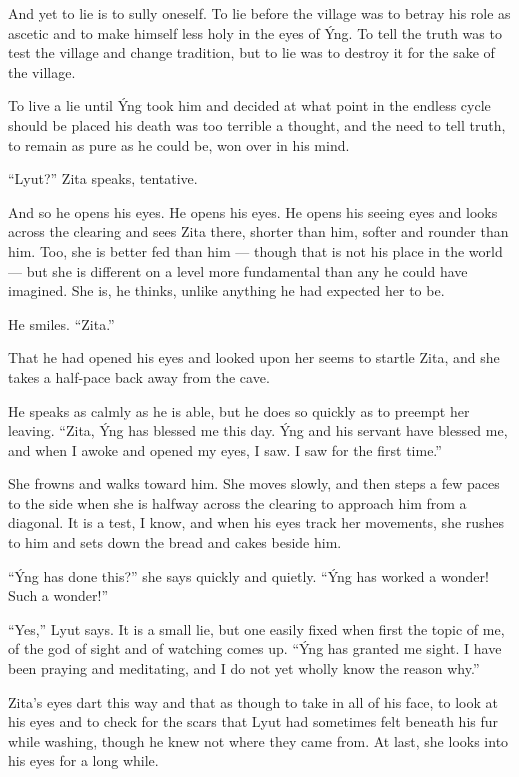 And yet to lie is to sully oneself. To lie before the village was to betray his role as ascetic and to make himself less holy in the eyes of Ýng. To tell the truth was to test the village and change tradition, but to lie was to destroy it for the sake of the village.

To live a lie until Ýng took him and decided at what point in the endless cycle should be placed his death was too terrible a thought, and the need to tell truth, to remain as pure as he could be, won over in his mind.

``Lyut?'' Zita speaks, tentative.

And so he opens his eyes. He opens his eyes. He opens his seeing eyes and looks across the clearing and sees Zita there, shorter than him, softer and rounder than him. Too, she is better fed than him --- though that is not his place in the world --- but she is different on a level more fundamental than any he could have imagined. She is, he thinks, unlike anything he had expected her to be.

He smiles. ``Zita.''

That he had opened his eyes and looked upon her seems to startle Zita, and she takes a half-pace back away from the cave.

He speaks as calmly as he is able, but he does so quickly as to preempt her leaving. ``Zita, Ýng has blessed me this day. Ýng and his servant have blessed me, and when I awoke and opened my eyes, I saw. I saw for the first time.''

She frowns and walks toward him. She moves slowly, and then steps a few paces to the side when she is halfway across the clearing to approach him from a diagonal. It is a test, I know, and when his eyes track her movements, she rushes to him and sets down the bread and cakes beside him.

``Ýng has done this?'' she says quickly and quietly. ``Ýng has worked a wonder! Such a wonder!''

``Yes,'' Lyut says. It is a small lie, but one easily fixed when first the topic of me, of the god of sight and of watching comes up. ``Ýng has granted me sight. I have been praying and meditating, and I do not yet wholly know the reason why.''

Zita's eyes dart this way and that as though to take in all of his face, to look at his eyes and to check for the scars that Lyut had sometimes felt beneath his fur while washing, though he knew not where they came from. At last, she looks into his eyes for a long while.

